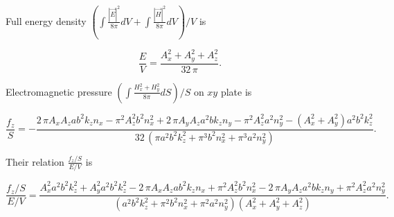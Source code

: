 \documentclass[twoside, 10pt, ptm]{article}
\begin{document}
\begin{multicols}{2}
    Full energy density
\(\left(\int \frac{|\vec{E}|^2}{8 \pi}dV + \int \frac{|\vec{H}|^2}{8 \pi}dV\right)\big/{V}\)
is

\begin{equation}\frac{E}{V} = \frac{{A_{x}^{2} + A_{y}^{2} + A_{z}^{2}}}{32 \, \pi}.\end{equation}

    Electromagnetic pressure
\(\left({\int \frac {H_x^2+H_y^2}{8 \pi} dS}\right)\big/{S}\) on \(xy\)
plate is

\end{multicols}


\begin{equation}\frac{f_z}{S} = -\frac{2 \, \pi A_{x} A_{z} a b^{2} k_{z} n_{x} - \pi^{2} A_{z}^{2} b^{2} n_{x}^{2} + 2 \, \pi A_{y} A_{z} a^{2} b k_{z} n_{y} - \pi^{2} A_{z}^{2} a^{2} n_{y}^{2} - {\left(A_{x}^{2} + A_{y}^{2}\right)} a^{2} b^{2} k_{z}^{2}}{32 \, {\left(\pi a^{2} b^{2} k_{z}^{2} + \pi^{3} b^{2} n_{x}^{2} + \pi^{3} a^{2} n_{y}^{2}\right)}}.\end{equation}

    Their relation \(\frac{f_z/S}{E/V}\) is

\begin{equation}\frac{f_z/S}{E/V} = \frac{A_{x}^{2} a^{2} b^{2} k_{z}^{2} + A_{y}^{2} a^{2} b^{2} k_{z}^{2} - 2 \, \pi A_{x} A_{z} a b^{2} k_{z} n_{x} + \pi^{2} A_{z}^{2} b^{2} n_{x}^{2} - 2 \, \pi A_{y} A_{z} a^{2} b k_{z} n_{y} + \pi^{2} A_{z}^{2} a^{2} n_{y}^{2}}{{\left(a^{2} b^{2} k_{z}^{2} + \pi^{2} b^{2} n_{x}^{2} + \pi^{2} a^{2} n_{y}^{2}\right)} {\left(A_{x}^{2} + A_{y}^{2} + A_{z}^{2}\right)}}.\end{equation}
\end{document}

